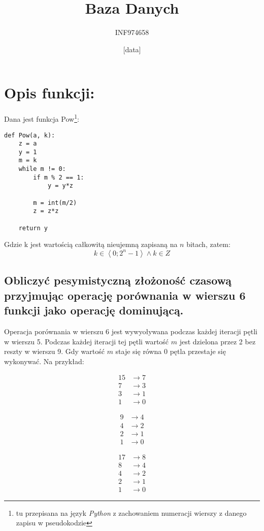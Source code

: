 \documentclass[a4paper,12pt]{article}
\title{Baza Danych}
\author{INF974658}
\date{[data]}
\begin{document}
\section*{Opis funkcji:}

Dana jest funkcja Pow\footnote{tu przepisana na język \emph{Python} z zachowaniem numeracji wierszy
z danego zapisu w pseudokodzie}:
\lstset{language = python,
	numbers = left,
	columns = fullflexible,
	frame = single}
	\begin{lstlisting}
def Pow(a, k):
	z = a
	y = 1
	m = k
	while m != 0:
		if m % 2 == 1:
			y = y*z
			
		m = int(m/2)
		z = z*z
		
	return y
	\end{lstlisting}
	
	Gdzie k jest wartością całkowitą nieujemną zapisaną na $n$ bitach, zatem:
	\[ k \in \left\langle 0 ; 2^n - 1 \right\rangle \wedge k \in Z\]
\subsection{Obliczyć pesymistyczną złożoność czasową przyjmując operację porównania w wierszu 6 funkcji
jako operację dominującą.}

Operacja porównania w wierszu 6 jest wywyoływana podczas każdej iteracji pętli w wierszu 5. Podczas każdej
iteracji tej pętli wartość $m$ jest dzielona przez 2 bez reszty w wierszu 9. Gdy wartość $m$ staje się równa 0
pętla przestaje się wykonywać. Na przykład:


\begin{minipage}[c]{0.3\textwidth}
\begin{align*}
		15 &\rightarrow 7 \\
		7 &\rightarrow 3 \\
		3 &\rightarrow 1 \\
		1 &\rightarrow 0 
\end{align*}
\end{minipage}
\begin{minipage}[c]{0.3\textwidth}
\begin{align*}
		9 &\rightarrow 4 \\
		4 &\rightarrow 2 \\
		2 &\rightarrow 1 \\
		1 &\rightarrow 0 
\end{align*}
\end{minipage}
\begin{minipage}[c]{0.3\textwidth}
\begin{align*}
		17 &\rightarrow 8 \\
		8 &\rightarrow 4 \\
		4 &\rightarrow 2 \\
		2 &\rightarrow 1 \\
		1 &\rightarrow 0 
\end{align*}
\end{minipage}
\end{document}
